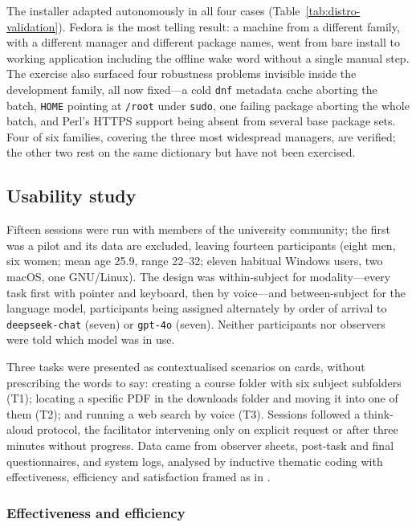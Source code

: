\documentclass[10pt,a4paper]{article}
\begin{document}
The installer adapted autonomously in all four cases (Table~\ref{tab:distro-validation}). Fedora is the most telling result: a machine from a different family, with a different manager and different package names, went from bare install to working application including the offline wake word without a single manual step. The exercise also surfaced four robustness problems invisible inside the development family, all now fixed---a cold \texttt{dnf} metadata cache aborting the batch, \texttt{HOME} pointing at \texttt{/root} under \texttt{sudo}, one failing package aborting the whole batch, and Perl's HTTPS support being absent from several base package sets. Four of six families, covering the three most widespread managers, are verified; the other two rest on the same dictionary but have not been exercised.

\subsection{Usability study}
\label{subsec:res-usability}

Fifteen sessions were run with members of the university community; the first was a pilot and its data are excluded, leaving fourteen participants (eight men, six women; mean age 25.9, range 22--32; eleven habitual Windows users, two macOS, one GNU/Linux). The design was within-subject for modality---every task first with pointer and keyboard, then by voice---and between-subject for the language model, participants being assigned alternately by order of arrival to \texttt{deepseek-chat} (seven) or \texttt{gpt-4o} (seven). Neither participants nor observers were told which model was in use.

Three tasks were presented as contextualised scenarios on cards, without prescribing the words to say: creating a course folder with six subject subfolders (T1); locating a specific PDF in the downloads folder and moving it into one of them (T2); and running a web search by voice (T3). Sessions followed a think-aloud protocol, the facilitator intervening only on explicit request or after three minutes without progress. Data came from observer sheets, post-task and final questionnaires, and system logs, analysed by inductive thematic coding \citep{Braun2006} with effectiveness, efficiency and satisfaction framed as in \citet{ISO9241_11}.

\subsubsection{Effectiveness and efficiency}
\end{document}
